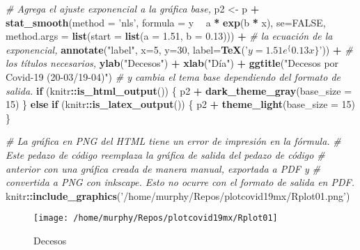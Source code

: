 \documentclass[]{article}
\newenvironment{Shaded}{\begin{snugshade}}{\end{snugshade}}
\newcommand{\CommentTok}[1]{\textcolor[rgb]{0.56,0.35,0.01}{\textit{#1}}}
\newcommand{\ControlFlowTok}[1]{\textcolor[rgb]{0.13,0.29,0.53}{\textbf{#1}}}
\newcommand{\DataTypeTok}[1]{\textcolor[rgb]{0.13,0.29,0.53}{#1}}
\newcommand{\DecValTok}[1]{\textcolor[rgb]{0.00,0.00,0.81}{#1}}
\newcommand{\FloatTok}[1]{\textcolor[rgb]{0.00,0.00,0.81}{#1}}
\newcommand{\KeywordTok}[1]{\textcolor[rgb]{0.13,0.29,0.53}{\textbf{#1}}}
\newcommand{\NormalTok}[1]{#1}
\newcommand{\OperatorTok}[1]{\textcolor[rgb]{0.81,0.36,0.00}{\textbf{#1}}}
\newcommand{\OtherTok}[1]{\textcolor[rgb]{0.56,0.35,0.01}{#1}}
\newcommand{\StringTok}[1]{\textcolor[rgb]{0.31,0.60,0.02}{#1}}
\begin{document}
\begin{Shaded}
\begin{Highlighting}[]
\CommentTok{# Agrega el ajuste exponencial a la gráfica base,}
\NormalTok{p2 <-}\StringTok{ }\NormalTok{p }\OperatorTok{+}
\StringTok{  }\KeywordTok{stat_smooth}\NormalTok{(}\DataTypeTok{method =} \StringTok{'nls'}\NormalTok{, }\DataTypeTok{formula =}\NormalTok{ y }\OperatorTok{~}\StringTok{ }\NormalTok{a }\OperatorTok{*}\StringTok{ }\KeywordTok{exp}\NormalTok{(b }\OperatorTok{*}\StringTok{ }\NormalTok{x), }\DataTypeTok{se=}\OtherTok{FALSE}\NormalTok{,}
              \DataTypeTok{method.args =} \KeywordTok{list}\NormalTok{(}\DataTypeTok{start =} \KeywordTok{list}\NormalTok{(}\DataTypeTok{a =} \FloatTok{1.51}\NormalTok{, }\DataTypeTok{b =}  \FloatTok{0.13}\NormalTok{))) }\OperatorTok{+}
\CommentTok{# la ecuación de la exponencial,}
\StringTok{      }\KeywordTok{annotate}\NormalTok{(}\StringTok{"label"}\NormalTok{, }\DataTypeTok{x=}\DecValTok{5}\NormalTok{, }\DataTypeTok{y=}\DecValTok{30}\NormalTok{, }\DataTypeTok{label=}\KeywordTok{TeX}\NormalTok{(}\StringTok{'$y  =  1.51  e^\{0.13  x \}$'}\NormalTok{)) }\OperatorTok{+}
\CommentTok{# los títulos necesarios,}
\StringTok{  }\KeywordTok{ylab}\NormalTok{(}\StringTok{"Decesos"}\NormalTok{) }\OperatorTok{+}\StringTok{ }\KeywordTok{xlab}\NormalTok{(}\StringTok{"Día"}\NormalTok{) }\OperatorTok{+}\StringTok{  }\KeywordTok{ggtitle}\NormalTok{(}\StringTok{"Decesos por Covid-19 (20-03/19-04)"}\NormalTok{) }
\CommentTok{# y cambia el tema base dependiendo del formato de salida.}
\ControlFlowTok{if}\NormalTok{ (knitr}\OperatorTok{::}\KeywordTok{is_html_output}\NormalTok{()) \{}
\NormalTok{  p2 }\OperatorTok{+}\StringTok{ }\KeywordTok{dark_theme_gray}\NormalTok{(}\DataTypeTok{base_size =} \DecValTok{15}\NormalTok{)}
\NormalTok{\} }\ControlFlowTok{else} \ControlFlowTok{if}\NormalTok{ (knitr}\OperatorTok{::}\KeywordTok{is_latex_output}\NormalTok{()) \{}
\NormalTok{  p2 }\OperatorTok{+}\StringTok{ }\KeywordTok{theme_light}\NormalTok{(}\DataTypeTok{base_size =} \DecValTok{15}\NormalTok{)}
\NormalTok{\}}
\end{Highlighting}
\end{Shaded}

\begin{Shaded}
\begin{Highlighting}[]
\CommentTok{# La gráfica en PNG del HTML tiene un error de impresión en la fórmula.}
\CommentTok{# Este pedazo de código reemplaza la gráfica de salida del pedazo de código }
\CommentTok{# anterior con una gráfica creada de manera manual, exportada a PDF y}
\CommentTok{# convertida a PNG con inkscape. Esto no ocurre con el formato de salida en PDF.}
\NormalTok{  knitr}\OperatorTok{::}\KeywordTok{include_graphics}\NormalTok{(}\StringTok{'/home/murphy/Repos/plotcovid19mx/Rplot01.png'}\NormalTok{)}
\end{Highlighting}
\end{Shaded}

\begin{figure}

{\centering \texttt{[image: /home/murphy/Repos/plotcovid19mx/Rplot01]} 

}

\caption{Decesos}\label{fig:unnamed-chunk-7}
\end{figure}
\end{document}
